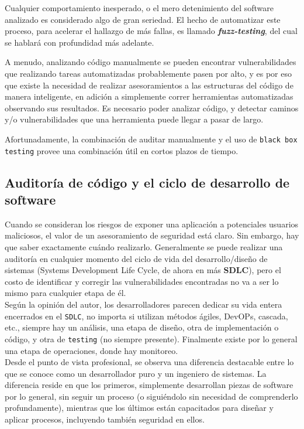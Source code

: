 Cualquier comportamiento inesperado, o el mero detenimiento del software analizado es considerado algo de gran seriedad. El hecho de automatizar este proceso, para acelerar el hallazgo de más fallas, es llamado \textbf{\textit{fuzz-testing}}, del cual se hablará con profundidad más adelante.

A menudo, analizando código manualmente se pueden encontrar vulnerabilidades que realizando tareas automatizadas probablemente pasen por alto, y es por eso que existe la necesidad de realizar asesoramientos a las estructuras del código de manera inteligente, en adición a simplemente correr herramientas automatizadas observando sus resultados. Es necesario poder analizar código, y detectar caminos y/o vulnerabilidades que una herramienta puede llegar a pasar de largo.

Afortunadamente, la combinación de auditar manualmente y el uso de \texttt{black box testing} provee una combinación útil en cortos plazos de tiempo.

\subsection{Auditoría de código y el ciclo de desarrollo de software}
Cuando se consideran los riesgos de exponer una aplicación a potenciales usuarios maliciosos, el valor de un asesoramiento de seguridad está claro. Sin embargo, hay que saber exactamente cuándo realizarlo. Generalmente se puede realizar una auditoría en cualquier momento del ciclo de vida del desarrollo/diseño de sistemas\cite{Highsmith2001AgileSD} (Systems Development Life Cycle, de ahora en más \textbf{SDLC}), pero el costo de identificar y corregir las vulnerabilidades encontradas no va a ser lo mismo para cualquier etapa de él.\\

Según la opinión del autor, los desarrolladores parecen dedicar su vida entera encerrados en el \texttt{SDLC}, no importa si utilizan métodos ágiles, DevOPs, cascada, etc., siempre hay un análisis, una etapa de diseño, otra de implementación o código, y otra de \texttt{testing} (no siempre presente). Finalmente existe por lo general una etapa de operaciones, donde hay monitoreo.\\

Desde el punto de vista profesional, se observa una diferencia destacable entre lo que se conoce como un desarrollador puro y un ingeniero de sistemas. La diferencia reside en que los primeros, simplemente desarrollan piezas de software por lo general, sin seguir un proceso (o siguiéndolo sin necesidad de comprenderlo profundamente), mientras que los últimos están capacitados para diseñar y aplicar procesos, incluyendo también seguridad en ellos.\\

